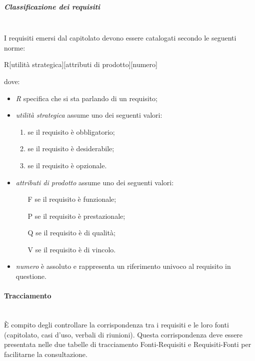 \subparagraph{Classificazione dei requisiti}\mbox{}\\
I requisiti emersi dal capitolato devono essere catalogati secondo le seguenti norme:
\begin{center}
	R[utilità strategica][attributi di prodotto][numero]
\end{center}
dove:
\begin{itemize}
	\item \textit{R} specifica che si sta parlando di un requisito;
	\item \textit{utilità strategica} assume uno dei seguenti valori:
	\begin{enumerate}
		\item se il requisito è obbligatorio;
		\item se il requisito è desiderabile;
		\item se il requisito è opzionale.
	\end{enumerate}
	\item \textit{attributi di prodotto} assume uno dei seguenti valori:
	\begin{itemize}
		\item [F] se il requisito è funzionale;
		\item [P] se il requisito è prestazionale;
		\item [Q] se il requisito è di qualità;
		\item [V] se il requisito è di vincolo.
	\end{itemize}
	\item \textit{numero} è assoluto e rappresenta un riferimento univoco al requisito in questione.
\end{itemize}

\paragraph{Tracciamento}\mbox{}\\
\`{E} compito degli \Analisti{} controllare la corrispondenza tra i requisiti e le loro fonti (capitolato, casi d'uso, verbali di riunioni). Questa corrispondenza deve essere presentata nelle due tabelle di tracciamento Fonti-Requisiti e Requisiti-Fonti per facilitarne la consultazione. 

